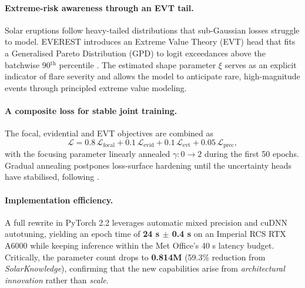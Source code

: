 \paragraph{Extreme-risk awareness through an EVT tail.}
Solar eruptions follow heavy-tailed distributions that sub-Gaussian losses struggle to model. \textsc{EVEREST} introduces an Extreme Value Theory (EVT) head that fits a Generalised Pareto Distribution (GPD) to logit exceedances above the batchwise 90$^{\mathrm{th}}$ percentile \citep{coles2001extremes}. The estimated shape parameter $\xi$ serves as an explicit indicator of flare severity and allows the model to anticipate rare, high-magnitude events through principled extreme value modeling.

\paragraph{A composite loss for stable joint training.}
The focal, evidential and EVT objectives are combined as
\[
  \mathcal{L}=0.8\,\mathcal{L}_{\text{focal}}
             +0.1\,\mathcal{L}_{\text{evid}}
             +0.1\,\mathcal{L}_{\text{evt}}
             +0.05\,\mathcal{L}_{\text{prec}},
\]
with the focusing parameter linearly annealed $\gamma:0\!\to\!2$ during the first 50 epochs. Gradual annealing postpones loss-surface hardening until the uncertainty heads have stabilised, following \citet{lin2017focal}.

\paragraph{Implementation efficiency.}
A full rewrite in PyTorch 2.2 leverages automatic mixed precision and cuDNN autotuning, yielding an epoch time of \textbf{24 s $\pm$ 0.4 s} on an Imperial RCS RTX A6000 while keeping inference within the Met Office's 40 s latency budget. Critically, the parameter count drops to \textbf{0.814M} (59.3\% reduction from \textit{SolarKnowledge}), confirming that the new capabilities arise from \emph{architectural innovation} rather than \emph{scale}.

